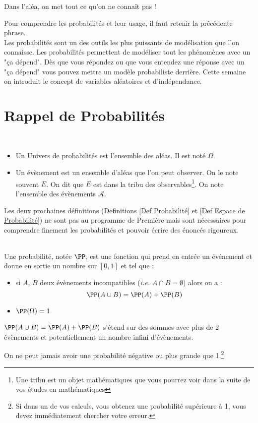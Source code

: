 \documentclass[12pt,fleqn]{report} %
\begin{document}
\LARGE Dans l'aléa, on met tout ce qu'on ne connaît pas !  \normalsize

Pour comprendre les probabilités et leur usage, il faut retenir la précédente phrase. \\ 

Les probabilités sont un des outils les plus puissants de modélisation que l'on connaisse. Les probabilités permettent de modéliser tout les phénomènes avec un "ça dépend". Dès que vous répondez ou que vous entendez une réponse avec un "ça dépend" vous pouvez mettre un modèle probabiliste derrière.  Cette semaine on introduit le concept de variables aléatoires et d'indépendance.

\section{Rappel de Probabilités}

\begin{definition}\text{ }\\
	\begin{itemize}
		\item Un Univers de probabilités est l'ensemble des aléas. Il est noté $\Omega$.
		\item Un évènement est un ensemble d'aléas que l'on peut observer. On le note souvent $E$. On dit que $E$ est dans la tribu des observables\footnote{Une tribu est un objet mathématiques que vous pourrez voir dans la suite de vos études en mathématiques}. On note l'ensemble des évènements $\mathcal{A}$.
	\end{itemize}
\end{definition}

Les deux prochaines définitions (Definitions \ref{Def Probabilité} et \ref{Def Espace de Probabilité}) ne sont pas au programme de Première mais sont nécessaires pour comprendre finement les probabilités et pouvoir écrire des énoncés rigoureux. 

\begin{definition}\label{Def Probabilité}\text{ }\\
	Une probabilité, notée $\PP$, est une fonction qui prend en entrée un événement et donne en sortie un nombre sur $[0,1]$ et tel que :
	\begin{itemize}
		\item si $A$, $B$ deux évènements incompatibles (\emph{i.e.} $A\cap B = \emptyset$) alors on a : \[
		\PP(A \cup B) = \PP(A) + \PP(B)
		\]
		\item $\PP(\Omega) = 1$
	\end{itemize}
	\begin{remark}
		$\PP(A \cup B) = \PP(A) + \PP(B)$ s'étend sur des sommes avec plus de 2 évènements et potentiellement un nombre infini d'évènements.
	\end{remark}
\end{definition}
\begin{remark}
	On ne peut jamais avoir une probabilité négative ou plus grande que 1.\footnote{Si dans un de vos calculs, vous obtenez une probabilité supérieure à 1, vous devez immédiatement chercher votre erreur.}
\end{remark}
\end{document}
